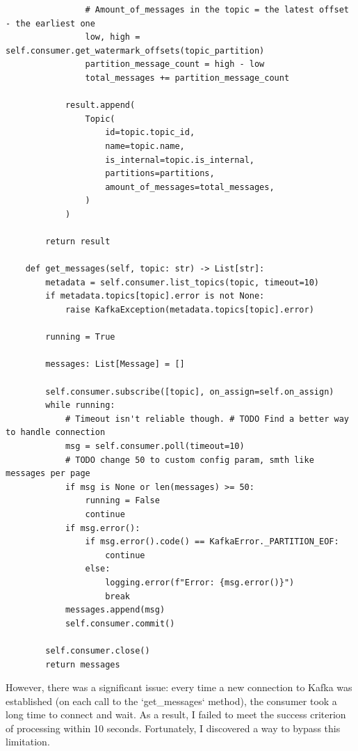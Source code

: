 \documentclass[10pt , a4paper]{report}
\newenvironment{code}{\captionsetup{type=listing}}{}
\begin{document}
\begin{code}
\begin{verbatim}
                # Amount_of_messages in the topic = the latest offset - the earliest one
                low, high = self.consumer.get_watermark_offsets(topic_partition)
                partition_message_count = high - low
                total_messages += partition_message_count

            result.append(
                Topic(
                    id=topic.topic_id,
                    name=topic.name,
                    is_internal=topic.is_internal,
                    partitions=partitions,
                    amount_of_messages=total_messages,
                )
            )

        return result

    def get_messages(self, topic: str) -> List[str]:
        metadata = self.consumer.list_topics(topic, timeout=10)
        if metadata.topics[topic].error is not None:
            raise KafkaException(metadata.topics[topic].error)

        running = True

        messages: List[Message] = []

        self.consumer.subscribe([topic], on_assign=self.on_assign)
        while running:
            # Timeout isn't reliable though. # TODO Find a better way to handle connection
            msg = self.consumer.poll(timeout=10)
            # TODO change 50 to custom config param, smth like messages per page
            if msg is None or len(messages) >= 50:
                running = False
                continue
            if msg.error():
                if msg.error().code() == KafkaError._PARTITION_EOF:
                    continue
                else:
                    logging.error(f"Error: {msg.error()}")
                    break
            messages.append(msg)
            self.consumer.commit()

        self.consumer.close()
        return messages
  \end{verbatim}
\end{code}

However, there was a significant issue: every time a new connection to Kafka was established (on each call to the `get\_messages` method), the consumer took a long time to connect and wait. As a result, I failed to meet the success criterion of processing within 10 seconds. Fortunately, I discovered a way to bypass this limitation.
\end{document}
